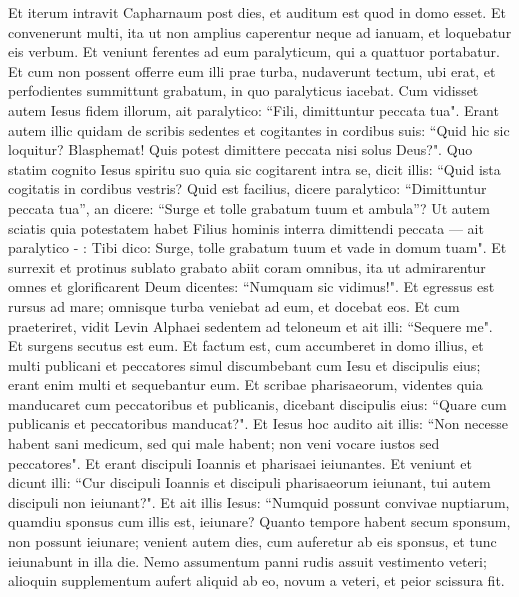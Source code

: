 \begin{biblechapter}  
\verse Et iterum intravit Capharnaum post dies, et auditum est quod in domo esset. 
\verse Et convenerunt multi, ita ut non amplius caperentur neque ad ianuam, et loquebatur eis verbum. 
\verse Et veniunt ferentes ad eum paralyticum, qui a quattuor portabatur. 
\verse Et cum non possent offerre eum illi prae turba, nudaverunt tectum, ubi erat, et perfodientes summittunt grabatum, in quo paralyticus iacebat. 
\verse Cum vidisset autem Iesus fidem illorum, ait paralytico: “Fili, dimittuntur peccata tua". 
\verse Erant autem illic quidam de scribis sedentes et cogitantes in cordibus suis:  
\verse “Quid hic sic loquitur? Blasphemat! Quis potest dimittere peccata nisi solus Deus?". 
\verse Quo statim cognito Iesus spiritu suo quia sic cogitarent intra se, dicit illis: “Quid ista cogitatis in cordibus vestris? 
\verse Quid est facilius, dicere paralytico: “Dimittuntur peccata tua”, an dicere: “Surge et tolle grabatum tuum et ambula”? 
\verse Ut autem sciatis quia potestatem habet Filius hominis interra dimittendi peccata — ait paralytico - : 
\verse Tibi dico: Surge, tolle grabatum tuum et vade in domum tuam". 
\verse Et surrexit et protinus sublato grabato abiit coram omnibus, ita ut admirarentur omnes et glorificarent Deum dicentes: “Numquam sic vidimus!". 
\verse Et egressus est rursus ad mare; omnisque turba veniebat ad eum, et docebat eos. 
\verse Et cum praeteriret, vidit Levin Alphaei sedentem ad teloneum et ait illi: “Sequere me". Et surgens secutus est eum. 
\verse Et factum est, cum accumberet in domo illius, et multi publicani et peccatores simul discumbebant cum Iesu et discipulis eius; erant enim multi et sequebantur eum. 
\verse Et scribae pharisaeorum, videntes quia manducaret cum peccatoribus et publicanis, dicebant discipulis eius: “Quare cum publicanis et peccatoribus manducat?".  
\verse Et Iesus hoc audito ait illis: “Non necesse habent sani medicum, sed qui male habent; non veni vocare iustos sed peccatores". 
\verse Et erant discipuli Ioannis et pharisaei ieiunantes. Et veniunt et dicunt illi: “Cur discipuli Ioannis et discipuli pharisaeorum ieiunant, tui autem discipuli non ieiunant?". 
\verse Et ait illis Iesus: “Numquid possunt convivae nuptiarum, quamdiu sponsus cum illis est, ieiunare? Quanto tempore habent secum sponsum, non possunt ieiunare; 
\verse venient autem dies, cum auferetur ab eis sponsus, et tunc ieiunabunt in illa die. 
\verse Nemo assumentum panni rudis assuit vestimento veteri; alioquin supplementum aufert aliquid ab eo, novum a veteri, et peior scissura fit. 

\end{biblechapter}
